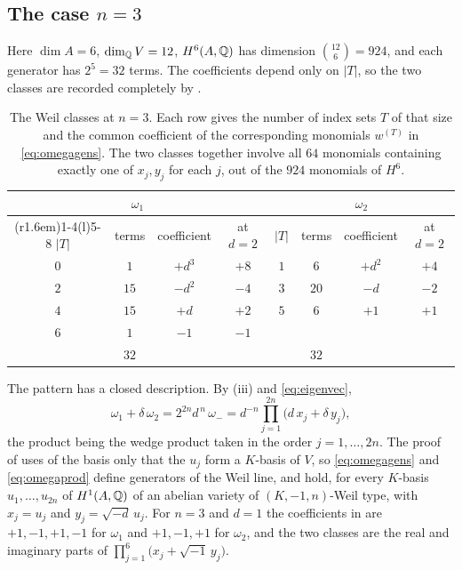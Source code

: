 \subsection{The case \texorpdfstring{$n=3$}{n=3}}

Here $\dim A=6$, $\dim_{\mathbb{Q}}V=12$, $H^{6}(A,\mathbb{Q})$ has dimension
$\binom{12}{6}=924$, and each generator has $2^{5}=32$ terms. The coefficients
depend only on $|T|$, so the two classes are recorded completely by
.

\begin{table}[htbp]
\centering
\renewcommand{\arraystretch}{1.2}
\begin{tabular}{@{}cccc@{\hskip 2.4em}cccc@{}}
\toprule
\multicolumn{4}{c}{$\omega_{1}$} & \multicolumn{4}{c}{$\omega_{2}$}\\
\cmidrule(r{1.6em}){1-4}\cmidrule(l){5-8}
$|T|$ & terms & coefficient & at $d=2$ &
$|T|$ & terms & coefficient & at $d=2$\\
\midrule
$0$ & $1$  & $+d^{3}$ & $+8$  & $1$ & $6$  & $+d^{2}$ & $+4$\\
$2$ & $15$ & $-d^{2}$ & $-4$  & $3$ & $20$ & $-d$     & $-2$\\
$4$ & $15$ & $+d$     & $+2$  & $5$ & $6$  & $+1$     & $+1$\\
$6$ & $1$  & $-1$     & $-1$  &     &      &          &     \\
\midrule
    & $32$ &          &       &     & $32$ &          &     \\
\bottomrule
\end{tabular}
\caption{The Weil classes at $n=3$. Each row gives the number of index sets
$T$ of that size and the common coefficient of the corresponding monomials
$w^{(T)}$ in \eqref{eq:omegagens}. The two classes together involve all $64$
monomials containing exactly one of $x_{j},y_{j}$ for each $j$, out of the
$924$ monomials of $H^{6}$.}
\label{tab:n3coeffs}
\end{table}

The pattern has a closed description. By (iii) and
\eqref{eq:eigenvec},
\begin{equation}\label{eq:omegaprod}
  \omega_{1}+\delta\,\omega_{2}
  =2^{2n}d^{\,n}\,\omega_{-}
  =d^{-n}\prod_{j=1}^{2n}\bigl(d\,x_{j}+\delta\,y_{j}\bigr),
\end{equation}
the product being the wedge product taken in the order $j=1,\dots,2n$. The
proof of  uses of the basis only that the $u_{j}$ form
a $K$-basis of $V$, so \eqref{eq:omegagens} and \eqref{eq:omegaprod} define
generators of the Weil line, and hold, for every $K$-basis $u_{1},\dots,u_{2n}$
of $H^{1}(A,\mathbb{Q})$ of an abelian variety of $(K,-1,n)$-Weil type, with
$x_{j}=u_{j}$ and $y_{j}=\sqrt{-d}\,u_{j}$. For
$n=3$ and $d=1$ the coefficients in  are $+1,-1,+1,-1$
for $\omega_{1}$ and $+1,-1,+1$ for $\omega_{2}$, and the two classes are the
real and imaginary parts of $\prod_{j=1}^{6}\bigl(x_{j}+\sqrt{-1}\,y_{j}\bigr)$.

